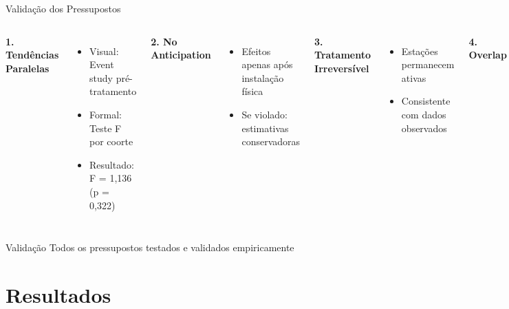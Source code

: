 \documentclass[10pt,aspectratio=169]{beamer}
\begin{document}
\begin{frame}{Validação dos Pressupostos}
\begin{columns}
\textbf{1. Tendências Paralelas}
\begin{itemize}
    \item Visual: Event study pré-tratamento
    \item Formal: Teste F por coorte
    \item Resultado: F = 1,136 (p = 0,322)
\end{itemize}

\vspace{0.3cm}
\textbf{2. No Anticipation}
\begin{itemize}
    \item Efeitos apenas após instalação física
    \item Se violado: estimativas conservadoras
\end{itemize}

\textbf{3. Tratamento Irreversível}
\begin{itemize}
    \item Estações permanecem ativas
    \item Consistente com dados observados
\end{itemize}

\vspace{0.3cm}
\textbf{4. Overlap}
\begin{itemize}
    \item Características sobrepostas
    \item Garantido pela seleção da amostra
\end{itemize}
\end{columns}

\vspace{0.5cm}
\begin{alertblock}{Validação}
Todos os pressupostos testados e validados empiricamente
\end{alertblock}
\end{frame}

\section{Resultados}
\end{document}
